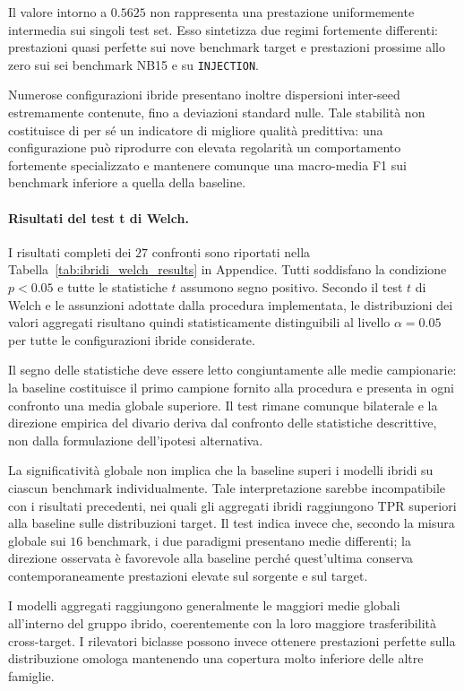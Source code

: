 Il valore intorno a $0.5625$ non rappresenta una prestazione uniformemente intermedia sui singoli test set. 
Esso sintetizza due regimi fortemente differenti: prestazioni quasi perfette sui nove benchmark target e prestazioni prossime allo zero sui sei benchmark NB15 e su \texttt{INJECTION}.

Numerose configurazioni ibride presentano inoltre dispersioni inter-seed estremamente contenute, fino a deviazioni standard nulle. 
Tale stabilità non costituisce di per sé un indicatore di migliore qualità predittiva: una configurazione può riprodurre con elevata regolarità un comportamento fortemente specializzato e mantenere comunque una macro-media F1 sui benchmark inferiore a quella della baseline.

\paragraph{Risultati del test t di Welch.}
I risultati completi dei $27$ confronti sono riportati nella Tabella~\ref{tab:ibridi_welch_results} in Appendice. 
Tutti soddisfano la condizione $p<0.05$ e tutte le statistiche $t$ assumono segno positivo.
Secondo il test $t$ di Welch e le assunzioni adottate dalla procedura implementata, le distribuzioni dei valori aggregati risultano quindi statisticamente distinguibili al livello $\alpha=0.05$ per tutte le configurazioni ibride considerate.

Il segno delle statistiche deve essere letto congiuntamente alle medie campionarie: la baseline costituisce il primo campione fornito alla procedura e presenta in ogni confronto una media globale superiore. 
Il test rimane comunque bilaterale e la direzione empirica del divario deriva dal confronto delle statistiche descrittive, non dalla formulazione dell'ipotesi alternativa.

La significatività globale non implica che la baseline superi i modelli ibridi su ciascun benchmark individualmente. 
Tale interpretazione sarebbe incompatibile con i risultati precedenti, nei quali gli aggregati ibridi raggiungono TPR superiori alla baseline sulle distribuzioni target. 
Il test indica invece che, secondo la misura globale sui $16$ benchmark, i due paradigmi presentano medie differenti; la direzione osservata è favorevole alla baseline perché quest'ultima conserva contemporaneamente prestazioni elevate sul sorgente e sul target.

I modelli aggregati raggiungono generalmente le maggiori medie globali all'interno del gruppo ibrido, coerentemente con la loro maggiore trasferibilità cross-target. 
I rilevatori biclasse possono invece ottenere prestazioni perfette sulla distribuzione omologa mantenendo una copertura molto inferiore delle altre famiglie.

